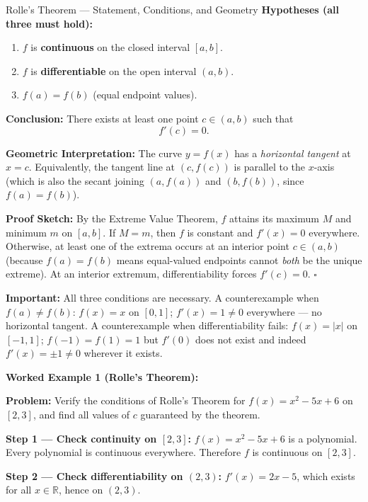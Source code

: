 \documentclass[12pt,a4paper]{article}
\begin{document}
\begin{infobox}{Rolle's Theorem --- Statement, Conditions, and Geometry}
\textbf{Hypotheses (all three must hold):}
\begin{enumerate}
  \item $f$ is \textbf{continuous} on the closed interval $[a, b]$.
  \item $f$ is \textbf{differentiable} on the open interval $(a, b)$.
  \item $f(a) = f(b)$ \quad (equal endpoint values).
\end{enumerate}

\textbf{Conclusion:} There exists at least one point $c \in (a, b)$ such that
\[
  f'(c) = 0.
\]

\textbf{Geometric Interpretation:} The curve $y = f(x)$ has a \emph{horizontal tangent} at
$x = c$. Equivalently, the tangent line at $(c, f(c))$ is parallel to the $x$-axis (which is
also the secant joining $(a, f(a))$ and $(b, f(b))$, since $f(a) = f(b)$).

\textbf{Proof Sketch:}
By the Extreme Value Theorem, $f$ attains its maximum $M$ and minimum $m$ on $[a, b]$.
If $M = m$, then $f$ is constant and $f'(x) = 0$ everywhere.
Otherwise, at least one of the extrema occurs at an interior point $c \in (a, b)$
(because $f(a) = f(b)$ means equal-valued endpoints cannot \emph{both} be the unique
extreme). At an interior extremum, differentiability forces $f'(c) = 0$. $\square$

\textbf{Important:} All three conditions are necessary. A counterexample when
$f(a) \neq f(b)$: $f(x) = x$ on $[0,1]$; $f'(x) = 1 \neq 0$ everywhere --- no horizontal tangent.
A counterexample when differentiability fails: $f(x) = |x|$ on $[-1, 1]$; $f(-1) = f(1) = 1$
but $f'(0)$ does not exist and indeed $f'(x) = \pm 1 \neq 0$ wherever it exists.
\end{infobox}

\textbf{Worked Example 1 (Rolle's Theorem):}

\medskip
\noindent\textbf{Problem:} Verify the conditions of Rolle's Theorem for
$f(x) = x^2 - 5x + 6$ on $[2, 3]$, and find all values of $c$ guaranteed by the theorem.

\medskip
\textbf{Step 1 --- Check continuity on $[2,3]$:}
$f(x) = x^2 - 5x + 6$ is a polynomial. Every polynomial is continuous everywhere.
Therefore $f$ is continuous on $[2, 3]$. \checkmark

\textbf{Step 2 --- Check differentiability on $(2,3)$:}
$f'(x) = 2x - 5$, which exists for all $x \in \mathbb{R}$, hence on $(2, 3)$. \checkmark
\end{document}
